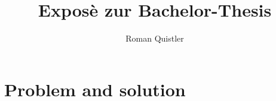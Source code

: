\documentclass[a4paper, 11pt]{scrartcl}
\title{Exposè zur Bachelor-Thesis}
\author{Roman Quistler}
\begin{document}
	
	
	
	\newpage
	\tableofcontents
	\newpage
	
	
	
	\section{Problem and solution}
	\label{sec:problem-solution}
	
	
	
	
	
	\newpage
	
	\begin{appendix}
		\listoffigures
	\end{appendix}
	
	\printbibliography
	
\end{document}

